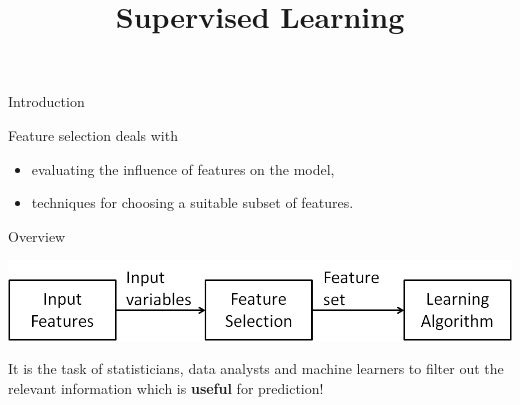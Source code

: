 \documentclass[11pt,compress,t,notes=noshow, xcolor=table]{beamer}
\title{Supervised Learning}
\date{}
\begin{document}

  \begin{vbframe}{Introduction}

    Feature selection deals with
    \begin{itemize}
      \item evaluating the influence of features on the model,
      \item techniques for choosing a suitable subset of features.
    \end{itemize}
  \end{vbframe}


  \begin{vbframe}{Overview}
    \begin{center}
    \includegraphics{figure_man/varsel_overview.png}
    \end{center}

    \lz

    It is the task of statisticians, data analysts and machine learners to filter out the relevant information which is \textbf{useful} for prediction!
  \end{vbframe}
\end{document}
